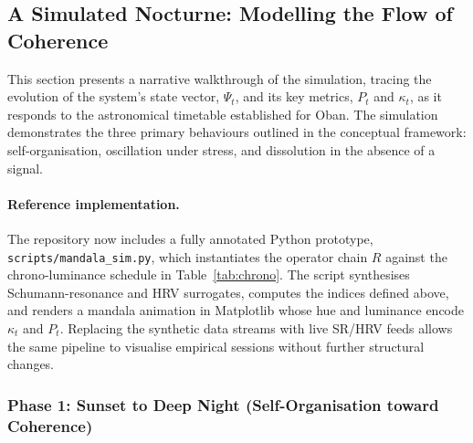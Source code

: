 \documentclass{article}
\newcommand{\Rt}{R}
\begin{document}
\subsection{A Simulated Nocturne: Modelling the Flow of Coherence}

This section presents a narrative walkthrough of the simulation, tracing the evolution of the system's state vector, $\Psi_t$, and its key metrics, $P_t$ and $\kappa_t$, as it responds to the astronomical timetable established for Oban. The simulation demonstrates the three primary behaviours outlined in the conceptual framework: self-organisation, oscillation under stress, and dissolution in the absence of a signal.

\paragraph{Reference implementation.} The repository now includes a fully annotated Python prototype, \texttt{scripts/mandala\_sim.py}, which instantiates the operator chain $\Rt$ against the chrono-luminance schedule in Table~\ref{tab:chrono}. The script synthesises Schumann-resonance and HRV surrogates, computes the indices defined above, and renders a mandala animation in Matplotlib whose hue and luminance encode $\kappa_t$ and $P_t$. Replacing the synthetic data streams with live SR/HRV feeds allows the same pipeline to visualise empirical sessions without further structural changes.

\subsubsection{Phase 1: Sunset to Deep Night (Self-Organisation toward Coherence)}
\end{document}
